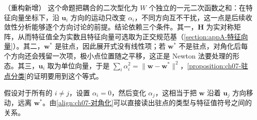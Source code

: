 \documentclass[../../main.tex]{subfiles}
\begin{document}
\begin{remark}（重构新增）
这个命题把耦合的二次型化为 $W$ 个独立的一元二次函数之和：在特征向量坐标下，沿 $\mathbf{u}_i$ 方向的运动只改变 $\alpha_i$，不同方向互不干扰，这一点是后续收敛性分析能够逐个方向讨论的前提。结论依赖三个条件。其一，$\mathbf{H}$ 为实对称矩阵，从而特征值全为实数且特征向量可选取为正交规范基（\cref{section:appA-特征向量}）。其二，$\mathbf{w}^{\ast}$ 是驻点，因此展开式没有线性项；若 $\mathbf{w}^{\ast}$ 不是驻点，对角化后每个方向还会残留一次项，极小点位置随之平移，这正是 Newton 法要处理的形态。其三，$\mathbf{u}_i$ 取为单位向量，于是 $\sum_i\alpha_i^{2}=\|\mathbf{w}-\mathbf{w}^{\ast}\|^{2}$，\cref{proposition:ch07-驻点分类}的证明要用到这个等式。
\end{remark}

假设对于所有的 $i\neq j$，设置 $\alpha_i=0$，然后变化 $\alpha_j$，这相当于把 $\mathbf{w}$ 沿着 $\mathbf{u}_j$ 方向移动，远离 $\mathbf{w}^{\ast}$。由\eqref{align:ch07-对角化}可以直接读出驻点的类型与特征值符号之间的关系。
\end{document}
